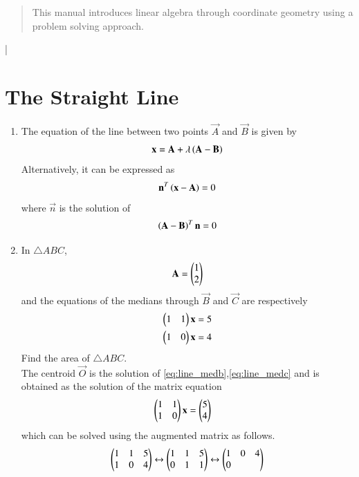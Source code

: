 \documentclass[journal,12pt,twocolumn]{IEEEtran}
\renewcommand\thesection{\arabic{section}}
\begin{document}
\begin{abstract}
	
This manual introduces linear algebra through coordinate geometry using a problem solving approach.
\end{abstract}
|\section{The Straight Line}
\begin{enumerate}[label=\thesection.\arabic*
,ref=\thesection.\theenumi]
\item The equation of the line between two points $\vec{A}$ and $\vec{B}$ is given by
\begin{equation}
\mathbf{x} = \mathbf{A} + \lambda \left(\mathbf{A}-\mathbf{B}\right)
\end{equation}
%
Alternatively, it can be expressed as
\begin{equation}
\label{eq:line_normal}
\mathbf{n}^T\left(\mathbf{x}-\mathbf{A}\right) = 0
\end{equation}
%
where $\vec{n}$ is the solution of
\begin{equation}
\label{eq:normal_slope}
\left(\mathbf{A}-\mathbf{B}\right)^T\mathbf{n} = 0
\end{equation}
\item In $\triangle ABC$,
\begin{equation}
\label{eq:linea}
\mathbf{A}=\begin{pmatrix}1\\2\end{pmatrix}
\end{equation}
%
and the equations of the medians through $\vec{B}$ and $\vec{C}$
are respectively
\begin{align}
\label{eq:line_medb}
\begin{pmatrix}1 & 1\end{pmatrix}\mathbf{x}&=5
\\
\begin{pmatrix}1 & 0\end{pmatrix}\mathbf{x}&=4
\label{eq:line_medc}
\end{align}
%
Find the area of $\triangle ABC$.
\\
\solution The centroid $\vec{O}$ is the solution of \eqref{eq:line_medb},\eqref{eq:line_medc} and is obtained 
as the solution
of the matrix equation
\begin{align}
\begin{pmatrix}1 & 1 \\1 & 0\end{pmatrix}\mathbf{x}&=\begin{pmatrix}5 \\ 4\end{pmatrix}
\label{eq:line_matrix}
\end{align}
%
which can be solved using the augmented matrix as follows.
\begin{align}
\begin{pmatrix}1 & 1 & 5\\1 & 0 & 4\end{pmatrix} \leftrightarrow \begin{pmatrix}1 & 1 & 5\\0 & 1 & 1\end{pmatrix}\leftrightarrow  \begin{pmatrix}1 & 0 & 4\\0 & 
\end{pmatrix}
\end{align}
\end{enumerate}
\end{document}
